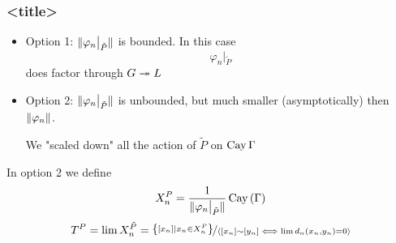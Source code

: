 \documentclass{beamer}[10]
\begin{document}

\begin{frame}
    \frametitle{<title>}

    \begin{itemize}
        \item Option 1: $\lVert \varphi_{n}\big\vert_{\tilde{P}} \rVert$ is bounded. In this case $$\varphi_{n}\big\vert_{\tilde{P}}$$ does factor through $G \twoheadrightarrow L$
        \item Option 2: $\lVert \varphi_{n}\big\vert_{\tilde{P}} \rVert$ is unbounded, but much smaller (asymptotically) then $\lVert \varphi_{n} \rVert$. 
        


        We "scaled down" all the action of $\tilde{P}$ on $\operatorname{Cay}{\Gamma}$



    \end{itemize} 

    In option 2 we define 
    \begin{equation*}
        X_{n}^{P} = \frac{1}{\lVert \varphi_{n}\big\vert_{\tilde{P}} \rVert} \operatorname{Cay} \left(  \Gamma  \right)
    \end{equation*}
    \begin{equation*}
        T^{P}=\lim X_{n}^{\tilde{P}} = \nicefrac{\left\{ \left[ x_n \right] \mid x_n\in X_{n}^{P} \right\}}{\left< \left[ x_n \right]\sim\left[ y_n \right] \iff \lim d_n \left( x_n,y_n \right) = 0 \right>}
    \end{equation*} 

\end{frame}
\end{document}
